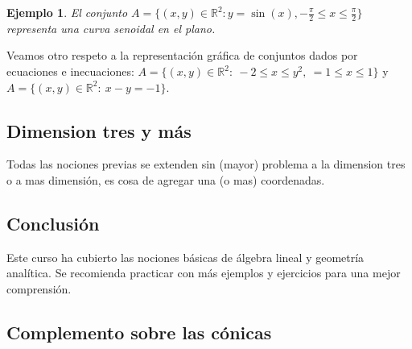 \documentclass[11pt]{book}
\newcommand{\R}{\mathbb{R}}
\theoremstyle{definicion}
\theoremstyle{teorema}
\theoremstyle{ejemplo}
\newtheorem{definition}{Definición}
\newtheorem{example}{Ejemplo}
\begin{document}
\begin{example}
El conjunto \(A = \{(x, y) \in \mathbb{R}^2 : y = \sin(x), -\frac{\pi}{2} \leq x \leq \frac{\pi}{2}\}\) representa una curva senoidal en el plano.
\end{example}

Veamos otro respeto a la representación gráfica de conjuntos dados por ecuaciones e inecuaciones:
$A=\{(x,y)\in\R^2:\ -2\leq x \leq y^2,\ =1\leq x \leq 1\}$ y
$A=\{(x,y)\in\R^2:\ x-y=-1\}$.

\subsection{Dimension tres y m\'as}

Todas las nociones previas se extenden sin (mayor) problema a la dimension tres o a mas dimensi\'on, es cosa de agregar una (o mas) coordenadas. 



\subsection{Conclusión}
Este curso ha cubierto las nociones básicas de álgebra lineal y geometría analítica. Se recomienda practicar con más ejemplos y ejercicios para una mejor comprensión.

\newpage

\subsection{Complemento sobre las cónicas}

\end{document}
